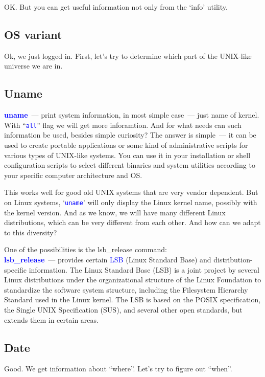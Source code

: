 \documentclass[12pt]{report}
\newcommand{\struct}[1]{\textcolor{blue}{#1}}
\newcommand{\cmd}[1]{\textcolor{blue}{\tt #1}}
\begin{document}
OK. But you can get useful information not only from the `info' utility.

\subsection*{OS variant}

Ok, we just logged in. First, let's try to determine which part of
the UNIX-like universe we are in.

\subsection*{Uname}

{\struct{\bf uname}}~--- print system information, in most simple case~---
just name of kernel. With ``\cmd{all}'' flag we will get more inforamtion.
And for what needs can such information be used, besides simple curiosity?
The answer is simple~--- it can be used to create portable applications or
some kind of administrative scripts for various types of UNIX-like systems.
You can use it in your installation or shell configuration scripts to select
different binaries and system utilities according to your specific computer
architecture and OS.

This works well for good old UNIX systems that are very vendor dependent.
But on Linux systems, `\cmd{uname}' will only display the Linux kernel name,
possibly with the kernel version. And as we know, we will have many
different Linux distributions, which can be very different from each other.
And how can we adapt to this diversity?

One of the possibilities is the lsb\_release command:\\
{\bf \struct{lsb\_release}}~--- provides certain \struct{LSB} (Linux Standard Base) and
distribution-specific information. The Linux Standard Base (LSB) is a joint
project by several Linux distributions under the organizational structure of
the Linux Foundation to standardize the software system structure, including
the Filesystem Hierarchy Standard used in the Linux kernel. The LSB is based on
the POSIX specification, the Single UNIX Specification (SUS),
and several other open standards, but extends them in certain areas.

\subsection*{Date}

Good. We get information about ``where''. Let's try to figure out ``when''.
\end{document}
